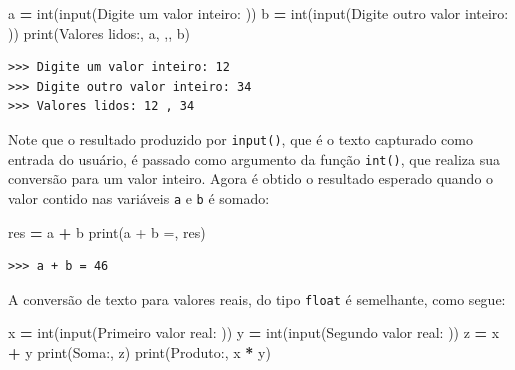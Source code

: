 \documentclass[
]{book}
\newenvironment{Shaded}{\begin{snugshade}}{\end{snugshade}}
\newcommand{\BuiltInTok}[1]{#1}
\newcommand{\NormalTok}[1]{#1}
\newcommand{\OperatorTok}[1]{\textcolor[rgb]{0.81,0.36,0.00}{\textbf{#1}}}
\newcommand{\StringTok}[1]{\textcolor[rgb]{0.31,0.60,0.02}{#1}}
\begin{document}
\begin{Shaded}
\begin{Highlighting}[]
\NormalTok{a }\OperatorTok{=} \BuiltInTok{int}\NormalTok{(}\BuiltInTok{input}\NormalTok{(}\StringTok{\textquotesingle{}Digite um valor inteiro: \textquotesingle{}}\NormalTok{))}
\NormalTok{b }\OperatorTok{=} \BuiltInTok{int}\NormalTok{(}\BuiltInTok{input}\NormalTok{(}\StringTok{\textquotesingle{}Digite outro valor inteiro: \textquotesingle{}}\NormalTok{))}
\BuiltInTok{print}\NormalTok{(}\StringTok{\textquotesingle{}Valores lidos:\textquotesingle{}}\NormalTok{, a, }\StringTok{\textquotesingle{},\textquotesingle{}}\NormalTok{, b)}
\end{Highlighting}
\end{Shaded}

\begin{verbatim}
>>> Digite um valor inteiro: 12
>>> Digite outro valor inteiro: 34
>>> Valores lidos: 12 , 34
\end{verbatim}

Note que o resultado produzido por \texttt{input()}, que é o texto capturado como entrada do usuário, é passado como argumento da função \texttt{int()}, que realiza sua conversão para um valor inteiro. Agora é obtido o resultado esperado quando o valor contido nas variáveis \texttt{a} e \texttt{b} é somado:

\begin{Shaded}
\begin{Highlighting}[]
\NormalTok{res }\OperatorTok{=}\NormalTok{ a }\OperatorTok{+}\NormalTok{ b}
\BuiltInTok{print}\NormalTok{(}\StringTok{\textquotesingle{}a + b =\textquotesingle{}}\NormalTok{, res)}
\end{Highlighting}
\end{Shaded}

\begin{verbatim}
>>> a + b = 46
\end{verbatim}

A conversão de texto para valores reais, do tipo \texttt{float} é semelhante, como segue:

\begin{Shaded}
\begin{Highlighting}[]
\NormalTok{x }\OperatorTok{=} \BuiltInTok{int}\NormalTok{(}\BuiltInTok{input}\NormalTok{(}\StringTok{\textquotesingle{}Primeiro valor real: \textquotesingle{}}\NormalTok{))}
\NormalTok{y }\OperatorTok{=} \BuiltInTok{int}\NormalTok{(}\BuiltInTok{input}\NormalTok{(}\StringTok{\textquotesingle{}Segundo valor real: \textquotesingle{}}\NormalTok{))}
\NormalTok{z }\OperatorTok{=}\NormalTok{ x }\OperatorTok{+}\NormalTok{ y}
\BuiltInTok{print}\NormalTok{(}\StringTok{\textquotesingle{}Soma:\textquotesingle{}}\NormalTok{, z)}
\BuiltInTok{print}\NormalTok{(}\StringTok{\textquotesingle{}Produto:\textquotesingle{}}\NormalTok{, x }\OperatorTok{*}\NormalTok{ y)}
\end{Highlighting}
\end{Shaded}
\end{document}
